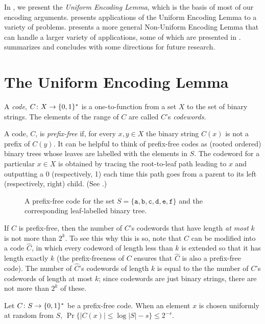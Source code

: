 \documentclass[lotsofwhite]{patmorin}
\begin{document}
In , we present the \emph{Uniform Encoding Lemma}, which is
the basis of most of our encoding arguments.  
presents  applications of the Uniform Encoding Lemma to a variety of
problems.   presents a more general Non-Uniform Encoding
Lemma that can handle a larger variety of applications, some of which are
presented in .   summarizes
and concludes with some directions for future research.



\section{The Uniform Encoding Lemma}

A \emph{code}, $C\colon X\to \{0,1\}^*$ is a one-to-function from a set
$X$ to the set of binary strings.  The elements of the range of $C$ are
called $C$'s \emph{codewords}.

A code, $C$, is \emph{prefix-free} if, for every $x,y\in X$ the binary
string $C(x)$ is not a prefix of $C(y)$.  It can be helpful to think
of prefix-free codes as (rooted ordered) binary trees whose leaves
are labelled with the elements in $S$.  The codeword for a particular
$x\in X$ is obtained by tracing the root-to-leaf path leading to $x$
and outputting a 0 (respectively, 1) each time this path goes from a
parent to its left (respectively, right) child. (See .)

\begin{figure}
  \caption{A prefix-free code for the set
    $S=\{\mathtt{a},\mathtt{b},\mathtt{c},\mathtt{d},\mathtt{e},\mathtt{f}\}$
    and the corresponding leaf-labelled binary tree.}
\end{figure}

If $C$ is prefix-free, then the number of $C$'s codewords that have
length \emph{at most} $k$ is not more than $2^k$. To see this why this
is so, note that $C$ can be modified into a code $\hat C$, in which
every codeword of length less than $k$ is extended so that it has length
exactly $k$ (the prefix-freeness of $C$ ensures that $\hat C$ is also a
prefix-free code). The number of $\hat C$'s codewords of length $k$ is
equal to the the number of $C$'s codewords of length at most $k$; since
codewords are just binary strings, there are not more than $2^k$ of these.

\begin{lem}
  Let $C\colon S\to \{0,1\}^*$ be a prefix-free code. When an element $x$
  is chosen uniformly at random from $S$, $\Pr\{|C(x)|\le \log|S|-s\}\le
  2^{-s}$.
\end{lem}
\end{document}
